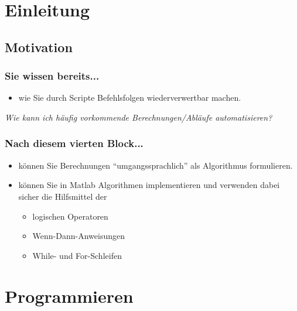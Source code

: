 


\setcounter{mchapter}{4}
\setcounter{mexercise}{0}


  

  \section{Einleitung}

  \subsection{Motivation}
  \begin{frame}
      \frametitle{Sie wissen bereits...}
      \begin{itemize}
          \item wie Sie durch Scripte Befehlsfolgen wiederverwertbar machen.
      \end{itemize}

      \textit{Wie kann ich häufig vorkommende Berechnungen/Abläufe automatisieren?}
  \end{frame}

  \begin{frame}
      \frametitle{Nach diesem vierten Block...}
      \begin{itemize}
          \item können Sie Berechnungen ``umgangssprachlich'' als Algorithmus formulieren.
          \item können Sie in Matlab Algorithmen implementieren und verwenden dabei sicher die Hilfsmittel der
          \begin{itemize}
              \item logischen Operatoren
              \item Wenn-Dann-Anweisungen
              \item While- und For-Schleifen
          \end{itemize}
      \end{itemize}
  \end{frame}

  \section{Programmieren}

